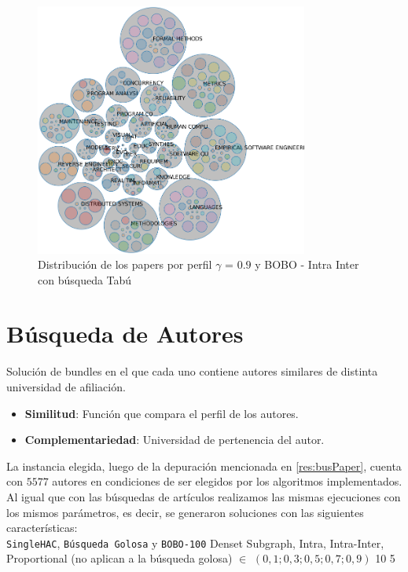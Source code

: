 \begin{figure}[H]
  \centering
    \includegraphics[width=0.8\textwidth]{resultados/papers/BOBO/INTRA_INTER/bubbles-gamma-with-local-09.png}
  \caption{Distribución de los papers por perfil $\gamma$ = $0.9$ y BOBO - Intra Inter con búsqueda Tabú}
  \label{res:img-papers-bubbles-gamma09-hac-intra-inter-bobo}
\end{figure}
\newpage
\section{Búsqueda de Autores}
Solución de bundles en el que cada uno contiene autores similares de distinta universidad de afiliación.\\
\begin{itemize}
  \item \textbf{Similitud}: Función que compara el perfil de los autores.
  \item \textbf{Complementariedad}: Universidad de pertenencia del autor.
\end{itemize}

La instancia elegida, luego de la depuración mencionada en \ref{res:busPaper}, cuenta con $5577$ autores en condiciones de ser elegidos por los algoritmos implementados.\\
Al igual que con las búsquedas de artículos realizamos las mismas ejecuciones con los mismos parámetros, es decir, se generaron soluciones con las siguientes características:\\
\Solucion
{}
{\texttt{SingleHAC}, \texttt{Búsqueda Golosa} y \texttt{BOBO-100}}
{Denset Subgraph, Intra, Intra-Inter, Proportional (no aplican a la búsqueda golosa)}
{$\in$ $(0,1; 0,3; 0,5; 0,7; 0,9)$}
{10}
{5}

